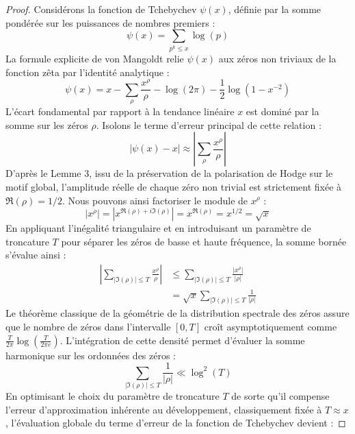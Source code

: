\documentclass[
]{article}
\begin{document}
\begin{proof}
Considérons la fonction de Tchebychev $\psi(x)$, définie par la somme pondérée sur les puissances de nombres premiers :
\begin{equation*}
\psi(x) = \sum_{p^k \le x} \log(p)
\end{equation*}
La formule explicite de von Mangoldt relie $\psi(x)$ aux zéros non triviaux de la fonction zêta par l'identité analytique :
\begin{equation*}
\psi(x) = x - \sum_{\rho} \frac{x^{\rho}}{\rho} - \log(2\pi) - \frac{1}{2} \log(1 - x^{-2})
\end{equation*}
L'écart fondamental par rapport à la tendance linéaire $x$ est dominé par la somme sur les zéros $\rho$.
Isolons le terme d'erreur principal de cette relation :
\begin{equation*}
\left| \psi(x) - x \right| \approx \left| \sum_{\rho} \frac{x^{\rho}}{\rho} \right|
\end{equation*}
D'après le Lemme 3, issu de la préservation de la polarisation de Hodge sur le motif global, l'amplitude réelle de chaque zéro non trivial est strictement fixée à $\Re(\rho) = 1/2$.
Nous pouvons ainsi factoriser le module de $x^{\rho}$ :
\begin{equation*}
\left| x^{\rho} \right| = \left| x^{\Re(\rho) + i\Im(\rho)} \right| = x^{\Re(\rho)} = x^{1/2} = \sqrt{x}
\end{equation*}
En appliquant l'inégalité triangulaire et en introduisant un paramètre de troncature $T$ pour séparer les zéros de basse et haute fréquence, la somme bornée s'évalue ainsi :
\begin{align*}
\left| \sum_{|\Im(\rho)| \le T} \frac{x^{\rho}}{\rho} \right| &\le \sum_{|\Im(\rho)| \le T} \frac{|x^{\rho}|}{|\rho|} \\
&= \sqrt{x} \sum_{|\Im(\rho)| \le T} \frac{1}{|\rho|}
\end{align*}
Le théorème classique de la géométrie de la distribution spectrale des zéros assure que le nombre de zéros dans l'intervalle $[0, T]$ croît asymptotiquement comme $\frac{T}{2\pi} \log\left(\frac{T}{2\pi e}\right)$.
L'intégration de cette densité permet d'évaluer la somme harmonique sur les ordonnées des zéros :
\begin{equation*}
\sum_{|\Im(\rho)| \le T} \frac{1}{|\rho|} \ll \log^2(T)
\end{equation*}
En optimisant le choix du paramètre de troncature $T$ de sorte qu'il compense l'erreur d'approximation inhérente au développement, classiquement fixée à $T \approx x$, l'évaluation globale du terme d'erreur de la fonction de Tchebychev devient :

\end{proof}
\end{document}
